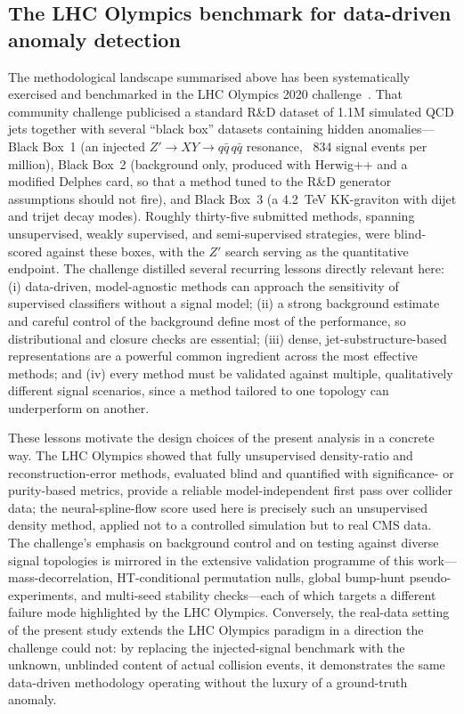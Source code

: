 \documentclass[11pt,a4paper,twocolumn]{article}
\begin{document}
\subsection{The LHC Olympics benchmark for data-driven anomaly detection}
\label{sec:lit-lhcolympics}

The methodological landscape summarised above has been systematically exercised and benchmarked in the LHC Olympics 2020 challenge~\cite{Kasieczka2021LHCOlympics}. That community challenge publicised a standard R\&D dataset of 1.1M simulated QCD jets together with several ``black box'' datasets containing hidden anomalies---Black Box~1 (an injected $Z'\to XY\to q\bar{q}\,q\bar{q}$ resonance, ~834 signal events per million), Black Box~2 (background only, produced with Herwig++ and a modified Delphes card, so that a method tuned to the R\&D generator assumptions should not fire), and Black Box~3 (a 4.2~TeV KK-graviton with dijet and trijet decay modes). Roughly thirty-five submitted methods, spanning unsupervised, weakly supervised, and semi-supervised strategies, were blind-scored against these boxes, with the $Z'$ search serving as the quantitative endpoint. The challenge distilled several recurring lessons directly relevant here: (i) data-driven, model-agnostic methods can approach the sensitivity of supervised classifiers without a signal model; (ii) a strong background estimate and careful control of the background define most of the performance, so distributional and closure checks are essential; (iii) dense, jet-substructure-based representations are a powerful common ingredient across the most effective methods; and (iv) every method must be validated against multiple, qualitatively different signal scenarios, since a method tailored to one topology can underperform on another.

These lessons motivate the design choices of the present analysis in a concrete way. The LHC Olympics showed that fully unsupervised density-ratio and reconstruction-error methods, evaluated blind and quantified with significance- or purity-based metrics, provide a reliable model-independent first pass over collider data; the neural-spline-flow score used here is precisely such an unsupervised density method, applied not to a controlled simulation but to real CMS data. The challenge's emphasis on background control and on testing against diverse signal topologies is mirrored in the extensive validation programme of this work---mass-decorrelation, HT-conditional permutation nulls, global bump-hunt pseudo-experiments, and multi-seed stability checks---each of which targets a different failure mode highlighted by the LHC Olympics. Conversely, the real-data setting of the present study extends the LHC Olympics paradigm in a direction the challenge could not: by replacing the injected-signal benchmark with the unknown, unblinded content of actual collision events, it demonstrates the same data-driven methodology operating without the luxury of a ground-truth anomaly.
\end{document}
